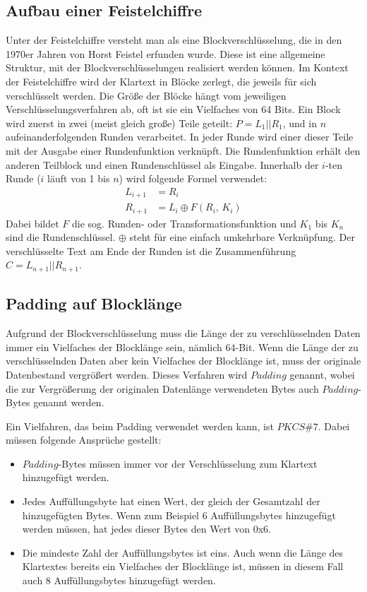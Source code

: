 \documentclass[course=erap]{aspdoc}
\begin{document}
\subsection{Aufbau einer Feistelchiffre}
Unter der Feistelchiffre versteht man als eine Blockverschlüsselung, die in den 1970er Jahren von Horst Feistel \cite{feistel:1973} erfunden wurde. Diese ist eine allgemeine Struktur, mit der Blockverschlüsselungen realisiert werden können. Im Kontext der Feistelchiffre wird der Klartext in Blöcke zerlegt, die jeweils für sich verschlüsselt werden. Die Größe der Blöcke hängt vom jeweiligen Verschlüsselungsverfahren ab, oft ist sie ein Vielfaches von 64 Bits. Ein Block wird zuerst in zwei (meist gleich große) Teile geteilt: $P=L_1||R_1$, und in $n$ aufeinanderfolgenden Runden verarbeitet. In jeder Runde wird einer dieser Teile mit der Ausgabe einer Rundenfunktion verknüpft. Die Rundenfunktion erhält den anderen Teilblock und einen Rundenschlüssel als Eingabe. Innerhalb der $i$-ten Runde ($i$ läuft von 1 bis $n$) wird folgende Formel verwendet:
\begin{align*}
L_{i+1} &= R_i\\
R_{i+1} &= L_i\oplus F(R_i,\,K_i)
\end{align*}
Dabei bildet $F$ die sog. Runden- oder Transformationsfunktion und $K_1$ bis $K_n$ sind die Rundenschlüssel. $\oplus$ steht für eine einfach umkehrbare Verknüpfung. Der verschlüsselte Text am Ende der Runden ist die Zusammenführung $C=L_{n+1}||R_{n+1}$.

\subsection{Padding auf Blocklänge}
Aufgrund der Blockverschlüsselung muss die Länge der zu verschlüsselnden Daten immer ein Vielfaches der Blocklänge sein, nämlich 64-Bit. Wenn die Länge der zu verschlüsselnden Daten aber kein Vielfaches der Blocklänge ist, muss der originale Datenbestand vergrößert werden. Dieses Verfahren wird $Padding$ genannt, wobei die zur Vergrößerung der originalen Datenlänge verwendeten Bytes auch $Padding$-Bytes genannt werden.

Ein Vielfahren, das beim Padding verwendet werden kann, ist $PKCS\#7$. Dabei müssen folgende Ansprüche gestellt:

\begin{itemize}
    \item $Padding$-Bytes müssen immer vor der Verschlüsselung zum Klartext hinzugefügt werden.
    \item Jedes Auffüllungsbyte hat einen Wert, der gleich der Gesamtzahl der hinzugefügten Bytes. Wenn zum Beispiel 6 Auffüllungsbytes hinzugefügt werden müssen, hat jedes dieser Bytes den Wert von 0x6.
    \item Die mindeste Zahl der Auffüllungsbytes ist eins. Auch wenn die Länge des Klartextes bereits ein Vielfaches der Blocklänge ist, müssen in diesem Fall auch 8 Auffüllungsbytes hinzugefügt werden.
\end{itemize}
\end{document}
